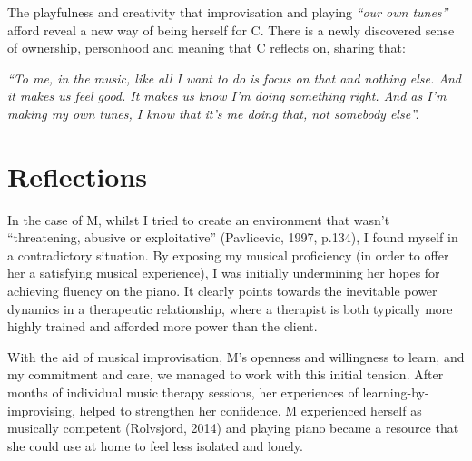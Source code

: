 \documentclass[authordate, empirical]{jote-new-article}
\begin{document}
	The playfulness and creativity that improvisation and playing \emph{“our own tunes”} afford reveal a new way of being herself for C. There is a newly discovered sense of ownership, personhood and meaning that C reflects on, sharing that:







	{\emph{“To me, in the music, like all I want to do is focus on that and nothing else. And it makes us feel good. It makes us know I'm doing something right. And as I'm making my own tunes, I know that it's me doing that, not somebody else”. }}











	\section{Reflections}







	In the case of M, whilst I tried to create an environment that wasn't “threatening, abusive or exploitative” (Pavlicevic, 1997, p.134), I found myself in a contradictory situation. By exposing my musical proficiency (in order to offer her a satisfying musical experience), I was initially undermining her hopes for achieving fluency on the piano. It clearly points towards the inevitable power dynamics in a therapeutic relationship, where a therapist is both typically more highly trained and afforded more power than the client.







	With the aid of musical improvisation, M's openness and willingness to learn, and my commitment and care, we managed to work with this initial tension. After months of individual music therapy sessions, her experiences of learning-by-improvising, helped to strengthen her confidence. M experienced herself as musically competent (Rolvsjord, 2014) and playing piano became a resource that she could use at home to feel less isolated and lonely.
\end{document}
